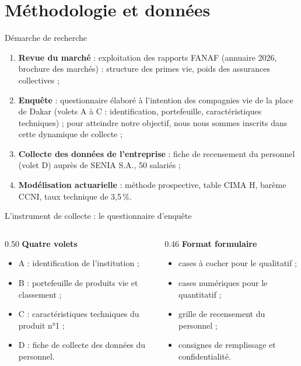 \documentclass[aspectratio=169,11pt]{beamer}
\begin{document}
\section{Méthodologie et données}

\begin{frame}{Démarche de recherche}
  \vspace{0.3cm}
  \begin{enumerate}\itemsep0.35cm
    \item \textbf{Revue du marché} : exploitation des rapports FANAF (annuaire
          2026, brochure des marchés) : structure des primes vie, poids des
          assurances collectives ;
    \item \textbf{Enquête} : questionnaire élaboré à l'intention des compagnies
          vie de la place de Dakar (volets A à C : identification, portefeuille,
          caractéristiques techniques) ; pour atteindre notre objectif, nous
          nous sommes inscrits dans cette dynamique de collecte ;
    \item \textbf{Collecte des données de l'entreprise} : fiche de recensement
          du personnel (volet D) auprès de SENIA S.A., 50 salariés ;
    \item \textbf{Modélisation actuarielle} : méthode prospective, table CIMA H,
          barème CCNI, taux technique de 3,5\,\%.
  \end{enumerate}
\end{frame}

\begin{frame}{L'instrument de collecte : le questionnaire d'enquête}
  \vspace{0.2cm}
  \begin{columns}[T]
    \begin{column}{0.50\textwidth}
      \textcolor{orangeC}{\textbf{Quatre volets}}
      \begin{itemize}\itemsep0.15cm
        \item A : identification de l'institution ;
        \item B : portefeuille de produits vie et classement ;
        \item C : caractéristiques techniques du produit n°1 ;
        \item D : fiche de collecte des données du personnel.
      \end{itemize}
    \end{column}
    \begin{column}{0.46\textwidth}
      \textcolor{orangeC}{\textbf{Format formulaire}}
      \begin{itemize}\itemsep0.15cm
        \item cases à cocher pour le qualitatif ;
        \item cases numériques pour le quantitatif ;
        \item grille de recensement du personnel ;
        \item consignes de remplissage et confidentialité.
      \end{itemize}
    \end{column}
  \end{columns}
\end{frame}
\end{document}
